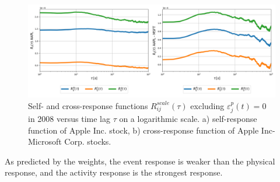 \begin{figure}[htbp]
    \centering
    \includegraphics[width=\textwidth]
    {figures/03_response_comparison_2008_AAPLi_MSFTj.png}
    \caption{Self- and cross-response functions
             $R^{scale}_{ij}\left(\tau\right)$ excluding
             $\varepsilon^{p}_{j}\left(t\right) = 0$ in 2008 versus time lag
             $\tau$ on a logarithmic scale. a) self-response function of Apple
             Inc. stock, b) cross-response function of Apple Inc-Microsoft
             Corp. stocks.}
    \label{fig:relation_responses}
\end{figure}

As predicted by the weights, the event response is weaker than the physical
response, and the activity response is the strongest response.